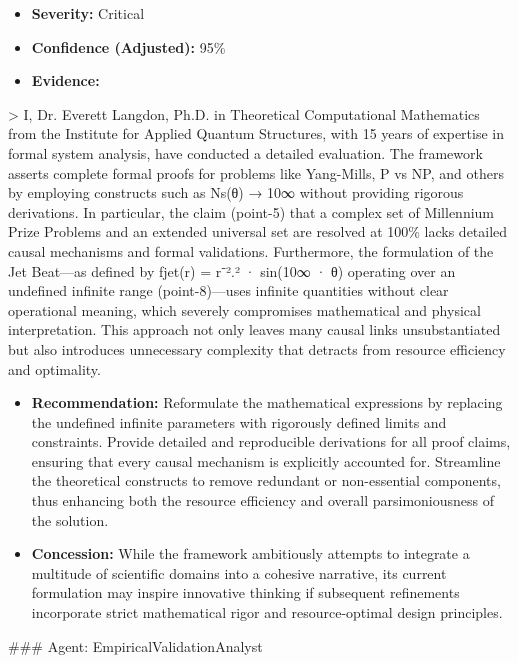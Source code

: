 \documentclass[12pt]{article}
\begin{document}
\begin{itemize}
  \item \textbf{Severity:} Critical
  \item \textbf{Confidence (Adjusted):} 95\%
  \item \textbf{Evidence:}
\end{itemize}
    > I, Dr. Everett Langdon, Ph.D. in Theoretical Computational Mathematics from the Institute for Applied Quantum Structures, with 15 years of expertise in formal system analysis, have conducted a detailed evaluation. The framework asserts complete formal proofs for problems like Yang-Mills, P vs NP, and others by employing constructs such as Ns(θ) → 10∞ without providing rigorous derivations. In particular, the claim (point-5) that a complex set of Millennium Prize Problems and an extended universal set are resolved at 100\% lacks detailed causal mechanisms and formal validations. Furthermore, the formulation of the Jet Beat—as defined by fjet(r) = r⁻².² · sin(10∞ · θ) operating over an undefined infinite range (point-8)—uses infinite quantities without clear operational meaning, which severely compromises mathematical and physical interpretation. This approach not only leaves many causal links unsubstantiated but also introduces unnecessary complexity that detracts from resource efficiency and optimality.
\begin{itemize}
  \item \textbf{Recommendation:} Reformulate the mathematical expressions by replacing the undefined infinite parameters with rigorously defined limits and constraints. Provide detailed and reproducible derivations for all proof claims, ensuring that every causal mechanism is explicitly accounted for. Streamline the theoretical constructs to remove redundant or non-essential components, thus enhancing both the resource efficiency and overall parsimoniousness of the solution.
  \item \textbf{Concession:} While the framework ambitiously attempts to integrate a multitude of scientific domains into a cohesive narrative, its current formulation may inspire innovative thinking if subsequent refinements incorporate strict mathematical rigor and resource-optimal design principles.
\end{itemize}
\hrulefill
\#\#\# Agent: EmpiricalValidationAnalyst
\end{document}

